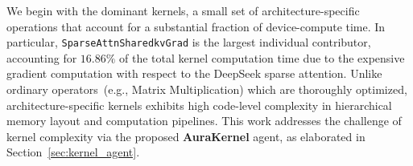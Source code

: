
We begin with the dominant kernels, a small set of architecture-specific operations that account for a substantial fraction of device-compute time. 
In particular,  \texttt{SparseAttnSharedkvGrad} is the largest individual contributor, accounting for $16.86\%$ of the total kernel computation time due to the expensive gradient computation with respect to the DeepSeek sparse attention. 
Unlike ordinary operators~(e.g., Matrix Multiplication) which are thoroughly optimized, architecture-specific kernels exhibits high code-level complexity in hierarchical memory layout and computation pipelines.
This work addresses the challenge of kernel complexity via the proposed \textbf{AuraKernel} agent, as elaborated in Section~\ref{sec:kernel_agent}.

